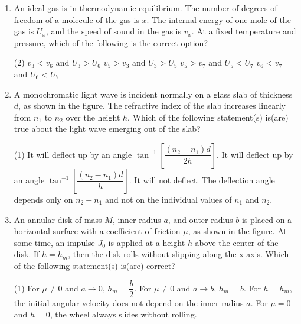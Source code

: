 \documentclass{article}
\renewcommand{\frac}[2]{\dfrac{#1}{#2}}
\begin{document}
\begin{enumerate}
    \item An ideal gas is in thermodynamic equilibrium. The number of degrees of freedom of a molecule of the gas is \( x \). The internal energy of one mole of the gas is \( U_x \), and the speed of sound in the gas is \( v_x \). At a fixed temperature and pressure, which of the following is the correct option?
        \begin{tasks}(2)
            \task \( v_3 < v_6 \) and \( U_3 > U_6 \)
            \task \( v_5 > v_3 \) and \( U_3 > U_5 \)
            \task \( v_5 > v_7 \) and \( U_5 < U_7 \)
            \task \( v_6 < v_7 \) and \( U_6 < U_7 \)
        \end{tasks}

    \item A monochromatic light wave is incident normally on a glass slab of thickness \(d\), as shown in the figure. The refractive index of the slab increases linearly from \(n_1\) to \(n_2\) over the height \(h\). Which of the following statement(s) is(are) true about the light wave emerging out of the slab?
        \begin{tasks}(1)
            \task It will deflect up by an angle \(\tan^{-1}\left[\frac{(n_2-n_1)d}{2h}\right]\).
            \task It will deflect up by an angle \(\tan^{-1}\left[\frac{(n_2-n_1)d}{h}\right]\).
            \task It will not deflect.
            \task The deflection angle depends only on \(n_2 - n_1\) and not on the individual values of \(n_1\) and \(n_2\).
        \end{tasks}
    \item An annular disk of mass \(M\), inner radius \(a\), and outer radius \(b\) is placed on a horizontal surface with a coefficient of friction \(\mu\), as shown in the figure. At some time, an impulse \(J_0\) is applied at a height \(h\) above the center of the disk. If \(h = h_m\), then the disk rolls without slipping along the x-axis. Which of the following statement(s) is(are) correct?
        \begin{tasks}(1)
            \task For \(\mu \neq 0\) and \(a \rightarrow 0\), \(h_m = \frac{b}{2}\).
            \task For \(\mu \neq 0\) and \(a \rightarrow b\), \(h_m = b\).
            \task For \(h = h_m\), the initial angular velocity does not depend on the inner radius \(a\).
            \task For \(\mu = 0\) and \(h = 0\), the wheel always slides without rolling.
        \end{tasks}


\end{enumerate}
\end{document}
